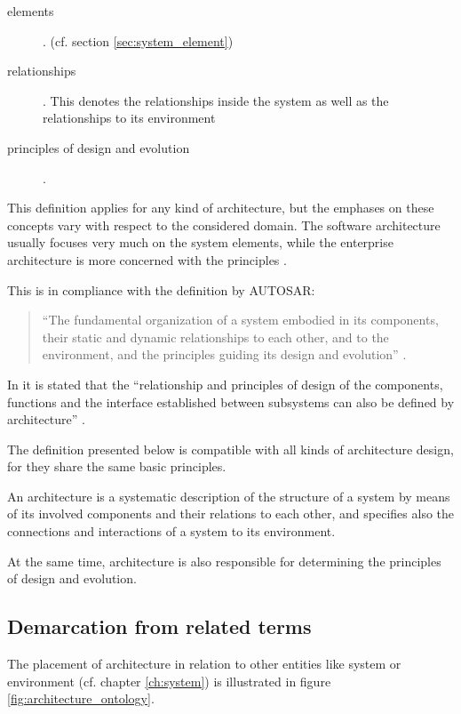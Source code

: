 	\begin{description}
		\item [elements]. (cf. section \ref{sec:system_element})
		\item [relationships]. This denotes the relationships inside the system as well as the relationships to its environment
		\item [principles of design and evolution].
	\end{description}
This definition applies for any kind of architecture, but the emphases on these concepts vary with respect to the considered domain. The software architecture usually focuses very much on the system elements, while the enterprise architecture is more concerned with the principles \cite{ISO_42010}.

This is in compliance with the definition by AUTOSAR:
\begin{quote}
``The fundamental organization of a system embodied in its components, their static and dynamic relationships to each other, and to the environment, and the principles guiding its design and evolution'' \cite{autosar_glossary}.
\end{quote}

In \cite{rodrigues2011} it is stated that the ``relationship and principles of design of the components, functions and the interface established between subsystems can also be defined by architecture'' \cite{rodrigues2011}.

The definition presented below is compatible with all kinds of architecture design, for they share the same basic principles.

\begin{myquote}
An architecture is a systematic description of the structure of a system by means of its involved components and their relations to each other, and specifies also the connections and interactions of a system to its environment.

At the same time, architecture is also responsible for determining the principles of design and evolution.
\end{myquote}


\subsection{Demarcation from related terms}
The placement of architecture in relation to other entities like system or environment (cf. chapter \ref{ch:system}) is illustrated in figure \ref{fig:architecture_ontology}. 

